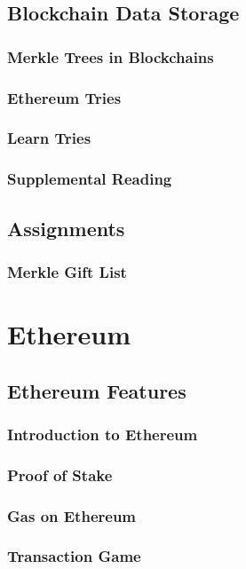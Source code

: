 \documentclass[a4paper, oneside]{book}
\begin{document}
\section{Blockchain Data Storage}
\subsection{Merkle Trees in Blockchains}
\subsection{Ethereum Tries}
\subsection{Learn Tries}
\subsection{Supplemental Reading}

\section{Assignments}
\subsection{Merkle Gift List}


\chapter{Ethereum}

\section{Ethereum Features}
\subsection{Introduction to Ethereum}
\subsection{Proof of Stake}
\subsection{Gas on Ethereum}
\subsection{Transaction Game}
\end{document}
